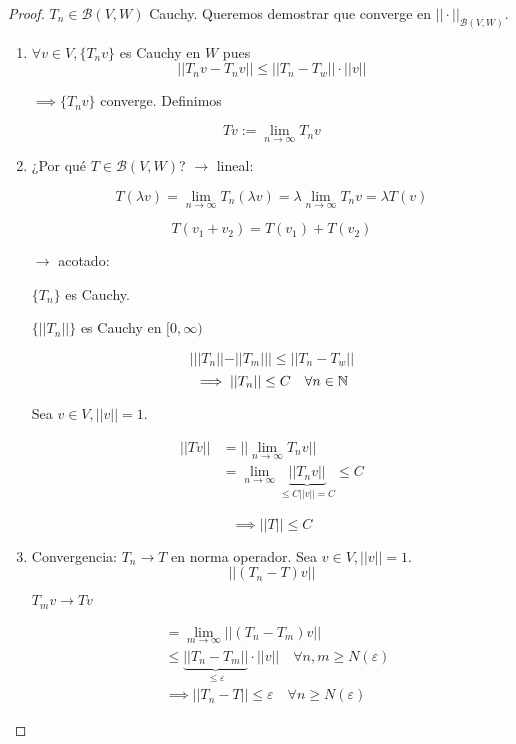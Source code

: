     \begin{proof}
        $T_n\in \mathcal{B}(V,W)$ Cauchy. Queremos demostrar que converge en $||\cdot||_{\mathcal{B}(V,W)}$.

        \begin{enumerate}
            \item $\forall v\in V,\{T_n v\}$ es Cauchy en $W$ pues 
            \[||T_n v-T_n v||\leq ||T_n-T_w||\cdot ||v||\]

            $\implies \{T_nv\}$ converge. Definimos 

            \[Tv:=\lim_{n\to\infty} T_nv\]

            \item ¿Por qué $T\in \mathcal{B}(V,W)$?
            $\rightarrow$ lineal:

            \[T(\lambda v)=\lim_{n\to\infty} T_n(\lambda v)=\lambda \lim_{n\to\infty} T_n v=\lambda T(v)\]

            \[T(v_1+v_2)=T(v_1)+T(v_2)\]

            $\rightarrow$ acotado:

            $\{T_n\}$ es Cauchy.

            $\{||T_n||\}$ es Cauchy en $[0,\infty)$

            \[|||T_n||-||T_m|||\leq ||T_n-T_w||\]
            \[\implies ||T_n||\leq C\quad \forall n\in \mathbb{N}\]

            Sea $v\in V, ||v||=1$.

            \begin{align*}||Tv||&=||\lim_{n\to\infty} T_n v||\\
            &=\lim_{n\to\infty} \underbrace{||T_n v||}_{\leq C||v||=C}\leq C\end{align*}

            \[\implies ||T||\leq C\]

            \item Convergencia: $T_n\to T$ en norma operador. Sea $v\in V, ||v||=1$.
            \[||(T_n-T)v||\]

            $T_m v\to Tv$

            \begin{align*}&=\lim_{m\to\infty}||(T_n-T_m)v||\\
            &\leq \underbrace{||T_n-T_m||}_{\leq\varepsilon}\cdot ||v||\quad \forall n,m\geq N(\varepsilon)\\
            &\implies ||T_n-T||\leq \varepsilon\quad \forall n\geq N(\varepsilon)\end{align*}
        \end{enumerate}
    \end{proof}

